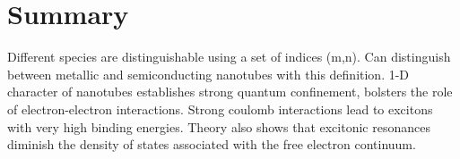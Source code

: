 \section{Summary}

Different species are distinguishable using a set of indices (m,n). Can distinguish between metallic and semiconducting nanotubes with this definition. 1-D character of nanotubes establishes strong quantum confinement, bolsters the role of electron-electron interactions. Strong coulomb interactions lead to excitons with very high binding energies. Theory also shows that excitonic resonances diminish the density of states associated with the free electron continuum.